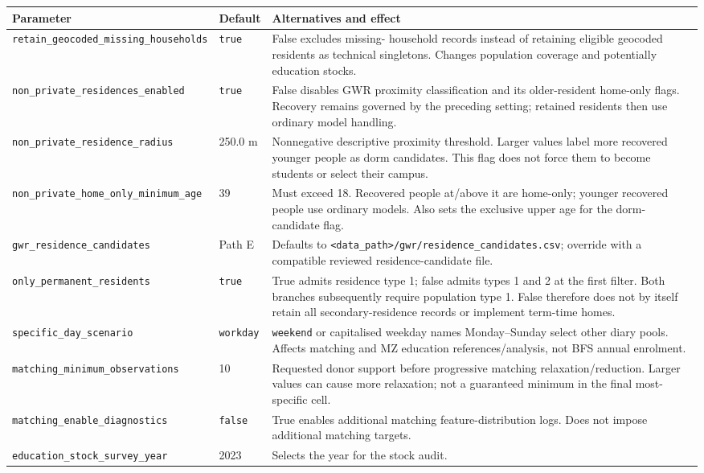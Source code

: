\documentclass[11pt,a4paper]{article}
\newcommand{\code}[1]{\nolinkurl{#1}}
\begin{document}
\begin{longtable}{L{.34\textwidth}L{.13\textwidth}L{.45\textwidth}}
\toprule Parameter & Default & Alternatives and effect \\
\midrule\endhead
\code{retain_geocoded_missing_households} & \code{true} & False excludes missing-
household records instead of retaining eligible geocoded residents as technical
singletons. Changes population coverage and potentially education stocks. \\
\code{non_private_residences_enabled} & \code{true} & False disables GWR proximity
classification and its older-resident home-only flags. Recovery remains governed
by the preceding setting; retained residents then use ordinary model handling. \\
\code{non_private_residence_radius} & 250.0 m & Nonnegative descriptive proximity
threshold. Larger values label more recovered younger people as dorm candidates.
This flag does not force them to become students or select their campus. \\
\code{non_private_home_only_minimum_age} & 39 & Must exceed 18. Recovered people
at/above it are home-only; younger recovered people use ordinary models. Also
sets the exclusive upper age for the dorm-candidate flag. \\
\code{gwr_residence_candidates} & Path E & Defaults to
\code{<data_path>/gwr/residence_candidates.csv}; override with a compatible
reviewed residence-candidate file. \\
\code{only_permanent_residents} & \code{true} & True admits residence type 1;
false admits types 1 and 2 at the first filter. Both branches subsequently
require population type 1. False therefore does not by itself retain all
secondary-residence records or implement term-time homes. \\
\code{specific_day_scenario} & \code{workday} & \code{weekend} or capitalised
weekday names Monday--Sunday select other diary pools. Affects matching and
MZ education references/analysis, not BFS annual enrolment. \\
\code{matching_minimum_observations} & 10 & Requested donor support before
progressive matching relaxation/reduction. Larger values can cause more relaxation;
not a guaranteed minimum in the final most-specific cell. \\
\code{matching_enable_diagnostics} & \code{false} & True enables additional
matching feature-distribution logs. Does not impose additional matching targets. \\
\code{education_stock_survey_year} & 2023 & Selects the year for the stock audit.

\end{longtable}
\end{document}
